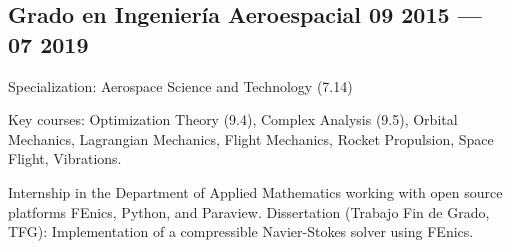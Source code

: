 \subsection{{Grado en Ingeniería Aeroespacial} \hfill	09 2015 --- 07 2019}  
\begin{zitemize}
\item Specialization: Aerospace Science and Technology (7.14)
\item Key courses: Optimization Theory (9.4), Complex Analysis (9.5), Orbital Mechanics, Lagrangian Mechanics, Flight
Mechanics, Rocket Propulsion, Space Flight, Vibrations.

\item Internship in the Department of Applied Mathematics working with open source platforms FEnics, Python, and
Paraview. Dissertation (Trabajo Fin de Grado, TFG): Implementation of a compressible Navier-Stokes solver using FEnics. 

\end{zitemize}
